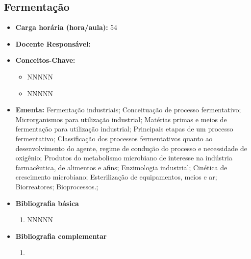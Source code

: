\documentclass[11pt,fleqn]{book} %
\begin{document}
\subsection{Fermentação}\label{disc:fermentacao}
\begin{itemize}
	\item \textbf{Carga horária (hora/aula):} 54
	\item \textbf{Docente Responsável:}
	\item \textbf{Conceitos-Chave:}
	\begin{itemize}
		\item NNNNN
		\item NNNNN
	\end{itemize}
	\item \textbf{Ementa:} 
	Fermentação industriais;
	Conceituação de processo fermentativo; 
	Microrganismos para utilização industrial; 
	Matérias primas e meios de fermentação para utilização industrial; 
	Principais etapas de um processo fermentativo; 
	Classificação dos processos fermentativos quanto ao desenvolvimento do agente, regime de condução do processo e necessidade de oxigênio;
	Produtos do metabolismo microbiano de interesse na indústria farmacêutica, de alimentos e afins; 
	Enzimologia industrial; 
	Cinética de crescimento microbiano;
	Esterilização de equipamentos, meios e ar;
	Biorreatores;
	Bioprocessos.;
	\item \textbf{Bibliografia básica}
	\begin{enumerate}
		\item NNNNN
	\end{enumerate}
	\item \textbf{Bibliografia complementar}
	\begin{enumerate}
		\item 
	\end{enumerate}	
\end{itemize}

\newpage
\end{document}

